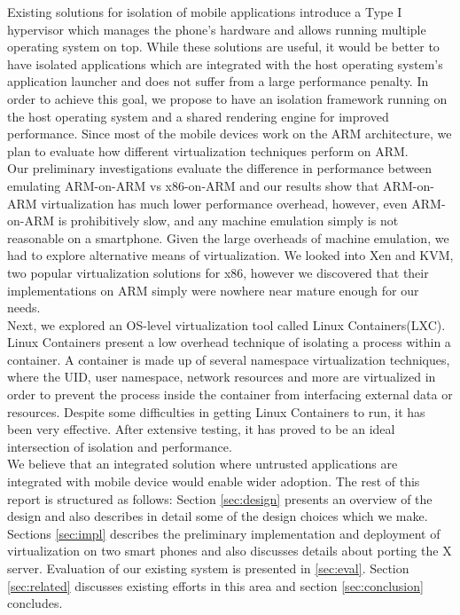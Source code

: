 Existing solutions for isolation of mobile applications introduce a Type I hypervisor \cite{mvp, okl4} which manages the phone's hardware and allows running multiple operating system on top. While these solutions are useful, it would be better to have isolated applications which are integrated with the host operating system's application launcher and does not suffer from a large performance penalty. In order to achieve this goal, we propose to have an isolation framework running on the host operating system and a shared rendering engine for improved performance. Since most of the mobile devices work on the ARM architecture, we plan to evaluate how different virtualization techniques perform on ARM.\\

Our preliminary investigations evaluate the difference in performance between emulating ARM-on-ARM vs x86-on-ARM and our results show that ARM-on-ARM virtualization has much lower performance overhead, however, even ARM-on-ARM is prohibitively slow, and any machine emulation simply is not reasonable on a smartphone.  Given the large overheads of machine emulation, we had to explore alternative means of virtualization.  We looked into Xen and KVM, two popular virtualization solutions for x86, however we discovered that their implementations on ARM simply were nowhere near mature enough for our needs. \\

Next, we explored an OS-level virtualization tool called Linux Containers(LXC). Linux Containers present a low overhead technique of isolating a process within a container.  A container is made up of several namespace virtualization techniques, where the UID, user namespace, network resources and more are virtualized in order to prevent the process inside the container from interfacing external data or resources.  Despite some difficulties in getting Linux Containers to run, it has been very effective.  After extensive testing, it has proved to be an ideal intersection of isolation and performance. \\

We believe that an integrated solution where untrusted applications are integrated with mobile device would enable wider adoption. The rest of this report is structured as follows: Section \ref{sec:design} presents an overview of the design and also describes in detail some of the design choices which we make. Sections \ref{sec:impl} describes the preliminary implementation and deployment of virtualization on two smart phones and also discusses details about porting the X server. Evaluation of our existing system is presented in \ref{sec:eval}. Section \ref{sec:related} discusses existing efforts in this area and section \ref{sec:conclusion} concludes. \\
